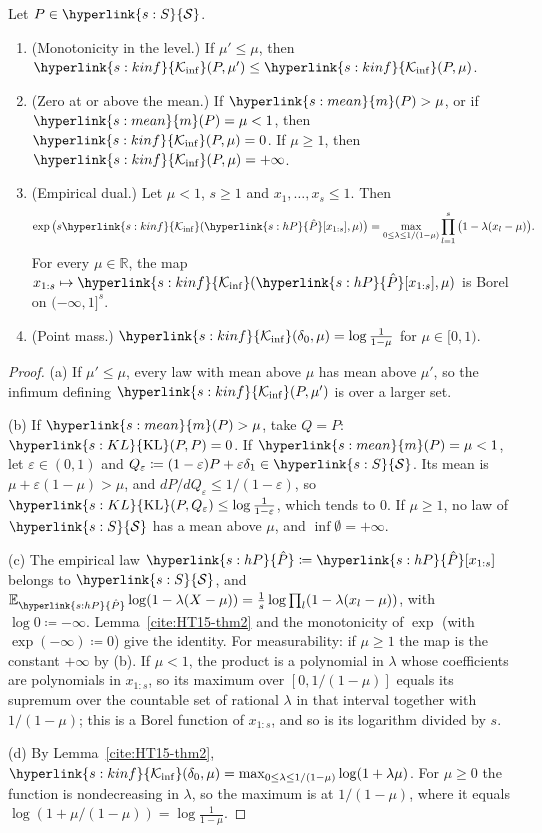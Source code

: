 \documentclass[11pt]{article}
\newcommand{\E}{\mathbb{E}}
\newcommand{\R}{\mathbb{R}}
\newcommand{\sy}[2]{{\hyperlink{#1}{#2}}}
\newcommand{\Sm}{\sy{s:S}{\mathcal{S}}}
\newcommand{\mean}{\sy{s:mean}{m}}
\newcommand{\KL}{\sy{s:KL}{\mathrm{KL}}}
\newcommand{\Kinf}{\sy{s:kinf}{\mathcal{K}_{\inf}}}
\newcommand{\hP}{\sy{s:hP}{\hat{P}}}
\begin{document}
\begin{lemma}\label{lem:dualfacts}
Let $P\in\Sm$.
\begin{enumerate}[label=(\alph*)]
\item (Monotonicity in the level.) If $\mu'\le\mu$, then $\Kinf(P,\mu')\le\Kinf(P,\mu)$.
\item (Zero at or above the mean.) If $\mean(P)>\mu$, or if $\mean(P)=\mu<1$, then $\Kinf(P,\mu)=0$. If
  $\mu\ge1$, then $\Kinf(P,\mu)=+\infty$.
\item (Empirical dual.) Let $\mu<1$, $s\ge1$ and $x_1,\dots,x_s\le1$. Then
  \[
    \exp\big(s\Kinf(\hP[x_{1:s}],\mu)\big)=\max_{0\le\lambda\le1/(1-\mu)}\prod_{l=1}^s\big(1-\lambda(x_l-\mu)\big).
  \]
  For every $\mu\in\R$, the map $x_{1:s}\mapsto\Kinf(\hP[x_{1:s}],\mu)$ is Borel on $(-\infty,1]^s$.
\item (Point mass.) $\Kinf(\delta_0,\mu)=\log\frac1{1-\mu}$ for $\mu\in[0,1)$.
\end{enumerate}
\end{lemma}

\begin{proof}
(a) If $\mu'\le\mu$, every law with mean above $\mu$ has mean above $\mu'$, so the infimum
defining $\Kinf(P,\mu')$ is over a larger set.

(b) If $\mean(P)>\mu$, take $Q=P$: $\KL(P,P)=0$. If $\mean(P)=\mu<1$, let $\varepsilon\in(0,1)$ and
$Q_\varepsilon\coloneqq(1-\varepsilon)P+\varepsilon\delta_1\in\Sm$. Its mean is
$\mu+\varepsilon(1-\mu)>\mu$, and $dP/dQ_\varepsilon\le1/(1-\varepsilon)$, so
$\KL(P,Q_\varepsilon)\le\log\frac1{1-\varepsilon}$, which tends to $0$. If $\mu\ge1$, no law of $\Sm$
has a mean above $\mu$, and $\inf\emptyset=+\infty$.

(c) The empirical law $\hP\coloneqq\hP[x_{1:s}]$ belongs to $\Sm$, and
$\E_{\hP}\log(1-\lambda(X-\mu))=\frac1s\log\prod_l(1-\lambda(x_l-\mu))$, with $\log0\coloneqq-\infty$.
Lemma~\ref{cite:HT15-thm2} and the monotonicity of $\exp$ (with $\exp(-\infty)\coloneqq0$) give the
identity. For measurability: if $\mu\ge1$ the map is the constant $+\infty$ by (b). If $\mu<1$,
the product is a polynomial in $\lambda$ whose coefficients are polynomials in $x_{1:s}$, so its
maximum over $[0,1/(1-\mu)]$ equals its supremum over the countable set of rational $\lambda$ in that
interval together with $1/(1-\mu)$; this is a Borel function of $x_{1:s}$, and so is its logarithm
divided by $s$.

(d) By Lemma~\ref{cite:HT15-thm2}, $\Kinf(\delta_0,\mu)=\max_{0\le\lambda\le1/(1-\mu)}\log(1+\lambda\mu)$.
For $\mu\ge0$ the function is nondecreasing in $\lambda$, so the maximum is at $1/(1-\mu)$, where it
equals $\log(1+\mu/(1-\mu))=\log\frac1{1-\mu}$.
\end{proof}
\end{document}

